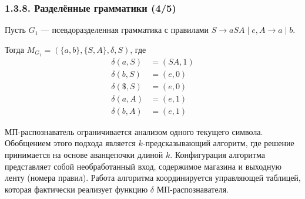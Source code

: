 \documentclass[mathserif,12pt,aspectratio=169]{beamer}
\begin{document}
\begin{frame}
\frametitle{1.3.8. Разделённые грамматики (4/5)}

\begin{example}
Пусть \( G_1 \) — псевдоразделенная грамматика с правилами
\(
S \to aSA \mid e,  A \to a \mid b.
\)

Тогда \( M_{G_1} = (\{a, b\}, \{S, A\}, \delta, S) \), где
\[
\begin{aligned}
\delta(a, S) &= (SA, 1)  \\
\delta(b, S) &= (e, 0) \\
\delta(\$, S) &= (e, 0) \\
\delta(a, A) &= (e, 1) \\
\delta(b, A) &= (e, 1)
\end{aligned}
\]
\end{example}


\begin{remark}
МП-распознаватель ограничивается анализом одного текущего символа. \\  
Обобщением этого подхода является $k$-предсказывающий алгоритм, где решение принимается на основе аванцепочки длиной $k$. Конфигурация алгоритма представляет собой необработанный вход, содержимое магазина и выходную ленту (номера правил). Работа алгоритма координируется управляющей таблицей, которая фактически реализует функцию \( \delta \) МП-распознавателя. 
\end{remark}
\end{frame}
\end{document}

